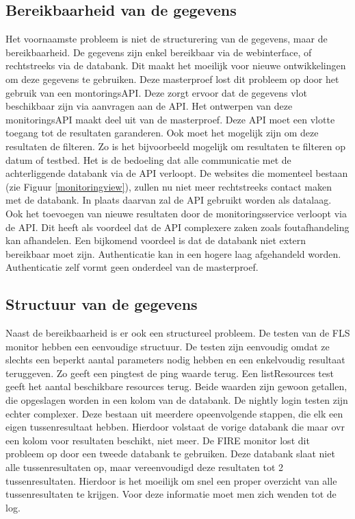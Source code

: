 \subsection{Bereikbaarheid van de gegevens}
\npar
Het voornaamste probleem is niet de structurering van de gegevens, maar de bereikbaarheid. De gegevens zijn enkel bereikbaar via de webinterface, of rechtstreeks via de databank. Dit maakt het moeilijk voor nieuwe ontwikkelingen om deze gegevens te gebruiken. Deze masterproef lost dit probleem op door het gebruik van een montoringsAPI. Deze zorgt ervoor dat de gegevens vlot beschikbaar zijn via aanvragen aan de API.
\npar
Het ontwerpen van deze monitoringsAPI maakt deel uit van de masterproef. Deze API moet een vlotte toegang tot de resultaten garanderen. Ook moet het mogelijk zijn om deze resultaten de filteren. Zo is het bijvoorbeeld mogelijk om resultaten te filteren op datum of testbed. Het is de bedoeling dat alle communicatie met de achterliggende databank via de API verloopt. De websites die momenteel bestaan (zie Figuur \ref{monitoringview}), zullen nu niet meer rechtstreeks contact maken met de databank. In plaats daarvan zal de API gebruikt worden als datalaag.
\npar
Ook het toevoegen van nieuwe resultaten door de monitoringsservice verloopt via de API. Dit heeft als voordeel dat de API complexere zaken zoals foutafhandeling kan afhandelen. Een bijkomend voordeel is dat de databank niet extern bereikbaar moet zijn. Authenticatie kan in een hogere laag afgehandeld worden. Authenticatie zelf vormt geen onderdeel van de masterproef.
\subsection{Structuur van de gegevens}
\npar
Naast de bereikbaarheid is er ook een structureel probleem. De testen van de FLS monitor hebben een eenvoudige structuur. De testen zijn eenvoudig omdat ze slechts een beperkt aantal parameters nodig hebben en een enkelvoudig resultaat teruggeven. Zo geeft een pingtest de ping waarde terug. Een listResources test geeft het aantal beschikbare resources terug. Beide waarden zijn gewoon getallen, die opgeslagen worden in een kolom van de databank.
\clearpage
\npar
De nightly login testen zijn echter complexer. Deze bestaan uit meerdere opeenvolgende stappen, die elk een eigen tussenresultaat hebben. Hierdoor volstaat de vorige databank die maar ovr een kolom voor resultaten beschikt, niet meer. De FIRE monitor lost dit probleem op door een tweede databank te gebruiken. Deze databank slaat niet alle tussenresultaten op, maar vereenvoudigd deze resultaten tot 2 tussenresultaten. Hierdoor is het moeilijk om snel een proper overzicht van alle tussenresultaten te krijgen. Voor deze informatie moet men zich wenden tot de log.

